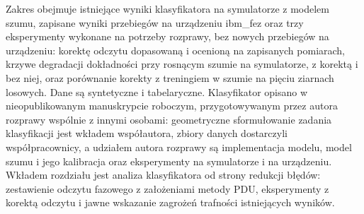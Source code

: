 Zakres obejmuje istniejące wyniki klasyfikatora na symulatorze z modelem szumu, zapisane wyniki przebiegów na urządzeniu ibm\_fez oraz trzy eksperymenty wykonane na potrzeby rozprawy, bez nowych przebiegów na urządzeniu: korektę odczytu dopasowaną i ocenioną na zapisanych pomiarach, krzywe degradacji dokładności przy rosnącym szumie na symulatorze, z korektą i bez niej, oraz porównanie korekty z treningiem w szumie na pięciu ziarnach losowych.
Dane są syntetyczne i tabelaryczne.
Klasyfikator opisano w nieopublikowanym manuskrypcie roboczym, przygotowywanym przez autora rozprawy wspólnie z innymi osobami: geometryczne sformułowanie zadania klasyfikacji jest wkładem współautora, zbiory danych dostarczyli współpracownicy, a udziałem autora rozprawy są implementacja modelu, model szumu i jego kalibracja oraz eksperymenty na symulatorze i na urządzeniu.
Wkładem rozdziału jest analiza klasyfikatora od strony redukcji błędów: zestawienie odczytu fazowego z założeniami metody PDU, eksperymenty z korektą odczytu i jawne wskazanie zagrożeń trafności istniejących wyników.

